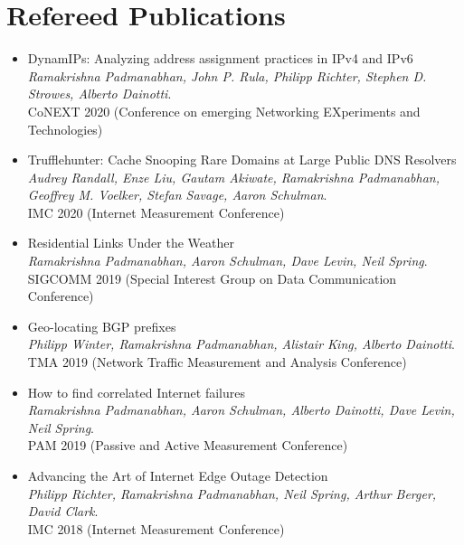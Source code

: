 \section*{Refereed Publications}
\label{sec:publications}
\begin{itemize}
 \setlength\itemsep{0em}

\item DynamIPs: Analyzing address assignment practices in IPv4 and IPv6 \\
  \emph{Ramakrishna Padmanabhan, John P. Rula, Philipp Richter, Stephen D. Strowes, Alberto Dainotti}. \\ 
  CoNEXT 2020 (Conference on emerging Networking EXperiments and Technologies) \\
 
\item Trufflehunter: Cache Snooping Rare Domains at Large Public DNS Resolvers \\
  \emph{Audrey Randall, Enze Liu, Gautam Akiwate, Ramakrishna Padmanabhan, Geoffrey M. Voelker, Stefan Savage, Aaron Schulman}. \\ 
  IMC 2020 (Internet Measurement Conference) \\

\item Residential Links Under the Weather \\
  \emph{Ramakrishna Padmanabhan, Aaron Schulman, Dave Levin, Neil Spring}. \\ 
  SIGCOMM 2019 (Special Interest Group on Data Communication Conference) \\

\item Geo-locating BGP prefixes \\
  \emph{Philipp Winter, Ramakrishna Padmanabhan, Alistair King, Alberto Dainotti}. \\ 
 TMA 2019 (Network Traffic Measurement and Analysis Conference)
 \\
  
\item  How to find correlated Internet failures \\
  \emph{Ramakrishna Padmanabhan, Aaron Schulman, Alberto Dainotti, Dave Levin, Neil
    Spring}. \\ 
 PAM 2019 (Passive and Active Measurement Conference) \\

\item  Advancing the Art of Internet Edge Outage Detection \\
  \emph{Philipp Richter, Ramakrishna Padmanabhan, Neil
    Spring, Arthur Berger, David Clark}. \\ 
  IMC 2018 (Internet Measurement Conference) \\


\end{itemize}
